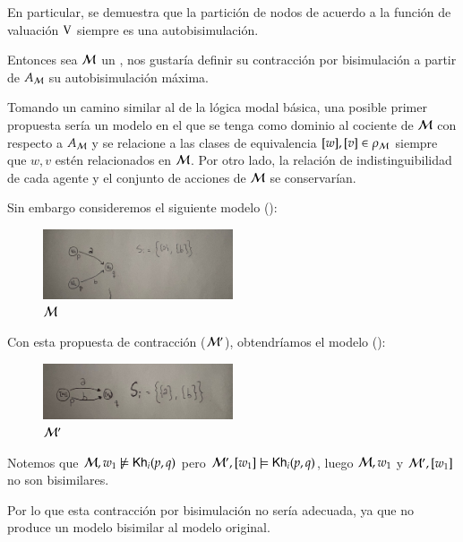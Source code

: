 En particular, se demuestra que la partición de nodos de acuerdo a la función de valuación $\mathrm{V}$ siempre es una autobisimulación.

Entonces sea $\mathcal{M}$ un \ults, nos gustaría definir su contracción por bisimulación a partir de $A_{\mathcal{M}}$ su autobisimulación máxima.

Tomando un camino similar al de la lógica modal básica, una posible primer propuesta sería un modelo en el que se tenga como dominio al cociente 
de $\mathcal{M}$ con respecto a $A_{\mathcal{M}}$ y se relacione a las clases de equivalencia $[w], [v] \in \rho_{\mathcal{M}}$ siempre que 
$w, v$ estén relacionados en $\mathcal{M}$. Por otro lado, la relación de indistinguibilidad de cada agente y el conjunto de acciones de $\mathcal{M}$ se conservarían.

Sin embargo consideremos el siguiente modelo ():

\begin{figure}[h]
    \centering
    \includegraphics[width=0.5\textwidth]{imagenes/1ra_propuesta_original.jpeg}
    \caption{$\mathcal{M}$}
    \label{fig:1stproposaloriginal}
\end{figure}

Con esta propuesta de contracción ($\mathcal{M}'$), obtendríamos el modelo ():

\begin{figure}[h]
    \centering
    \includegraphics[width=0.5\textwidth]{imagenes/1ra_propuesta_contraido.jpeg}
    \caption{$\mathcal{M}'$}
    \label{fig:1stproposalcontraction}
\end{figure}


Notemos que $\mathcal{M}, w_1 \not\models \mathsf{Kh}_i(p,q)$ pero $\mathcal{M}', [w_1] \models \mathsf{Kh}_i(p,q)$, luego $\mathcal{M},w_1$ y 
$\mathcal{M}',[w_1]$ no son bisimilares.

Por lo que esta contracción por bisimulación no sería adecuada, ya que no produce un modelo bisimilar al modelo original.

